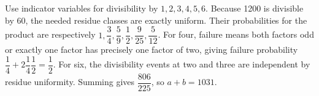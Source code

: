 Use indicator variables for divisibility by $1,2,3,4,5,6$. Because 1200 is divisible by 60, the needed residue classes are exactly uniform. Their probabilities for the product are respectively $1,\dfrac{3}{4},\dfrac{5}{9},\dfrac{1}{2},\dfrac{9}{25},\dfrac{5}{12}$. For four, failure means both factors odd or exactly one factor has precisely one factor of two, giving failure probability $\dfrac{1}{4}+2\dfrac{1}{4}\dfrac{1}{2}=\dfrac{1}{2}$. For six, the divisibility events at two and three are independent by residue uniformity. Summing gives $\dfrac{806}{225}$, so $\boxed{a+b=1031}$.

